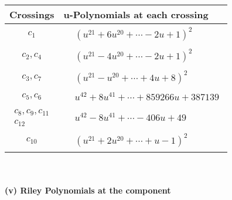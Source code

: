 \documentclass[1p]{elsarticle_modified}
\theoremstyle{definition}
\begin{document}
\begin{tabular}{m{50pt}|m{274pt}}
Crossings & \hspace{64pt}u-Polynomials at each crossing \\
\hline $$\begin{aligned}c_{1}\end{aligned}$$&$\begin{aligned}
&(u^{21}+6 u^{20}+\cdots-2 u+1)^{2}
\end{aligned}$\\
\hline $$\begin{aligned}c_{2},c_{4}\end{aligned}$$&$\begin{aligned}
&(u^{21}-4 u^{20}+\cdots-2 u+1)^{2}
\end{aligned}$\\
\hline $$\begin{aligned}c_{3},c_{7}\end{aligned}$$&$\begin{aligned}
&(u^{21}- u^{20}+\cdots+4 u+8)^{2}
\end{aligned}$\\
\hline $$\begin{aligned}c_{5},c_{6}\end{aligned}$$&$\begin{aligned}
&u^{42}+8 u^{41}+\cdots+859266 u+387139
\end{aligned}$\\
\hline $$\begin{aligned}c_{8},c_{9},c_{11}\\c_{12}\end{aligned}$$&$\begin{aligned}
&u^{42}-8 u^{41}+\cdots-406 u+49
\end{aligned}$\\
\hline $$\begin{aligned}c_{10}\end{aligned}$$&$\begin{aligned}
&(u^{21}+2 u^{20}+\cdots+u-1)^{2}
\end{aligned}$\\
\hline
\end{tabular}\\~\\
\newpage\renewcommand{\arraystretch}{1}
\flushleft \textbf{(v) Riley Polynomials at the component}\newline \\
\end{document}
